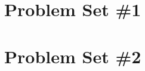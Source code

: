 \documentclass[11pt]{report}
\theoremstyle{plain}
\begin{document}

\newpage
\section*{Problem Set \#1}
\begin{enumerate}[(1)]
\end{enumerate}

\newpage
\section*{Problem Set \#2}
\begin{enumerate}[(1)]
\end{enumerate}
\end{document}
